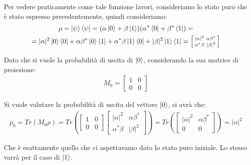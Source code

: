 Per vedere praticamente come tale funzione lavori, consideriamo lo stato puro che è stato espresso precedentemente, quindi consideriamo:
\begin{gather*}
\rho = \ket{\psi}\bra{\psi}=(\alpha \ket{0} + \beta \ket{1})(\alpha^* \bra{0} + \beta^* \bra{1})=\\
= |\alpha|^2 \ket{0}\bra{0} + \alpha \beta^* \ket{0}\bra{1} + \alpha^* \beta \ket{1}\bra{0} + |\beta|^2 \ket{1}\bra{1} = \left[\begin{smallmatrix}
|\alpha|^2 & \alpha \beta^* \\
\alpha^* \beta & |\beta|^2
\end{smallmatrix}\right]
\end{gather*}

Dato che si vuole la probabilità di uscita di \(\ket{0}\), considerando la sua matrice di proiezione:
\begin{gather*}
M_0 = \left[\begin{smallmatrix}
1 & 0 \\
0 & 0
\end{smallmatrix}\right]
\end{gather*}

Si vuole valutare la probabilità di uscita del vettore \(\ket{0}\), si avrà che:
\begin{gather*}
p_0 = Tr(M_0 \rho) = Tr\left(
\left[\begin{smallmatrix}
1 & 0 \\
0 & 0
\end{smallmatrix}\right]
\left[\begin{smallmatrix}
|\alpha|^2 & \alpha \beta^* \\
\alpha^* \beta & |\beta|^2
\end{smallmatrix}\right]
\right) = Tr\left(\left[\begin{smallmatrix}
|\alpha|^2 & \alpha \beta^* \\
0 & 0
\end{smallmatrix}\right]\right) = |\alpha|^2
\end{gather*}

Che è esattamente quello che ci aspettavamo dato lo stato puro iniziale. Lo stesso varrà per il caso di \(\ket{1}\). 

